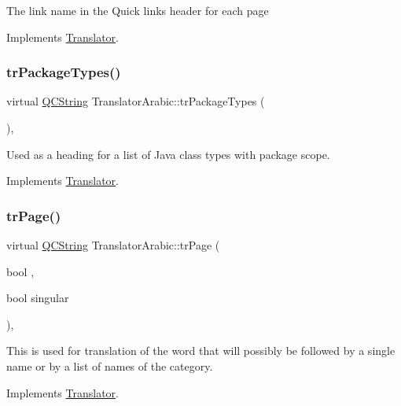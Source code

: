 The link name in the Quick links header for each page 

Implements \mbox{\hyperlink{class_translator}{Translator}}.

\mbox{\label{class_translator_arabic_a33836a76c01621404a4a1c6dd75193b8}} 
\subsubsection{\texorpdfstring{trPackageTypes()}{trPackageTypes()}}
{\footnotesize\ttfamily virtual \mbox{\hyperlink{class_q_c_string}{Q\+C\+String}} Translator\+Arabic\+::tr\+Package\+Types (\begin{DoxyParamCaption}{ }\end{DoxyParamCaption})\hspace{0.3cm}{\ttfamily [inline]}, {\ttfamily [virtual]}}

Used as a heading for a list of Java class types with package scope. 

Implements \mbox{\hyperlink{class_translator}{Translator}}.

\mbox{\label{class_translator_arabic_a01335b7b68d621778e021feffe7ad1cc}} 
\subsubsection{\texorpdfstring{trPage()}{trPage()}}
{\footnotesize\ttfamily virtual \mbox{\hyperlink{class_q_c_string}{Q\+C\+String}} Translator\+Arabic\+::tr\+Page (\begin{DoxyParamCaption}\item[{bool}]{,  }\item[{bool}]{singular }\end{DoxyParamCaption})\hspace{0.3cm}{\ttfamily [inline]}, {\ttfamily [virtual]}}

This is used for translation of the word that will possibly be followed by a single name or by a list of names of the category. 

Implements \mbox{\hyperlink{class_translator}{Translator}}.

\mbox{\label{class_translator_arabic_a3f633770ce93f1d2b3a1fc2fbd375101}} 

